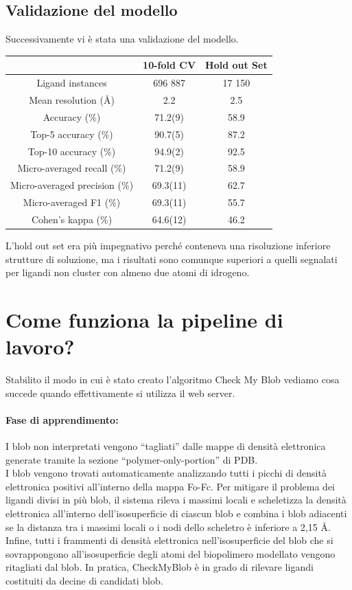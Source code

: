 \documentclass{article}
\begin{document}
\subsection{Validazione del modello}
Successivamente vi è stata una validazione del modello.
\begin{center}
  \begin{tabular}{c|c|c}
  \toprule
    & 10-fold CV & Hold out Set\\
    \midrule
    Ligand instances & 696 887 & 17 150 \\
    Mean resolution (Å) & 2.2 & 2.5 \\
    Accuracy (\%) & 71.2(9) & 58.9 \\
    Top-5 accuracy (\%) & 90.7(5) & 87.2 \\
    Top-10 accuracy (\%) & 94.9(2) & 92.5 \\
    Micro-averaged recall (\%) & 71.2(9) & 58.9 \\
    Micro-averaged precision (\%) & 69.3(11) & 62.7 \\
    Micro-averaged F1 (\%) & 69.3(11) & 55.7 \\
    Cohen’s kappa (\%) & 64.6(12) & 46.2 \\
    \bottomrule
  \end{tabular}
\end{center}
L’hold out set era più impegnativo perché conteneva una risoluzione inferiore strutture di soluzione, ma i risultati sono comunque superiori a quelli segnalati per ligandi non cluster con almeno due atomi di idrogeno.

\section{Come funziona la pipeline di lavoro?}
Stabilito il modo in cui è stato creato l'algoritmo Check My Blob vediamo cosa succede quando effettivamente si utilizza il web server.
\paragraph*{Fase di apprendimento:} I blob non interpretati vengono “tagliati” dalle mappe di densità elettronica generate tramite la sezione “polymer-only-portion” di PDB.\\
I blob vengono trovati automaticamente analizzando tutti i picchi di densità elettronica positivi all'interno della mappa Fo-Fc. Per mitigare il problema dei ligandi divisi in più blob, il sistema rileva i massimi locali e scheletizza la densità elettronica all'interno dell'isosuperficie di ciascun blob e 
combina i blob adiacenti se la distanza tra i massimi locali o i nodi dello scheletro è inferiore a 2,15 Å. Infine, tutti i frammenti di densità elettronica nell'isosuperficie del blob che si sovrappongono all'isosuperficie degli atomi del biopolimero modellato vengono ritagliati dal blob. In pratica, CheckMyBlob è in grado di rilevare ligandi costituiti da decine di candidati blob.
\end{document}
